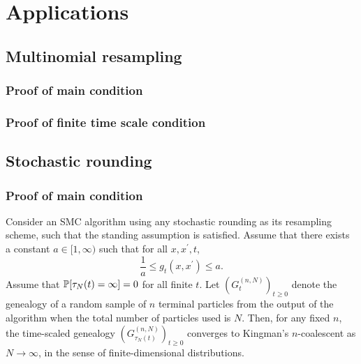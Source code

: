 \chapter{Applications}


\section{Multinomial resampling}

\subsection{Proof of main condition}

\subsection{Proof of finite time scale condition}


\section{Stochastic rounding}


\subsection{Proof of main condition}

\begin{corollary}\label{thm:stochrounding}
Consider an SMC algorithm using any stochastic rounding as its resampling scheme, such that the standing assumption is satisfied.
Assume that there exists a constant $a\in [1,\infty)$ such that for all $x, x^\prime, t$,
\begin{equation}\label{eq:gq_bounds_sr}
\frac{1}{a} \leq g_t(x, x^\prime) \leq a . %
\end{equation}
Assume that $\mathbb{P}[ \tau_N(t) = \infty] =0$ for all finite $t$.
Let $(G_t^{(n,N)})_{t\geq0}$ denote the genealogy of a random sample of $n$ terminal particles from the output of the algorithm when the total number of particles used is $N$. Then, for any fixed $n$, the time-scaled genealogy $(G_{\tau_N(t)}^{(n,N)})_{t\geq0}$ converges to Kingman's $n$-coalescent as $N\to \infty$, in the sense of finite-dimensional distributions.
\end{corollary}

